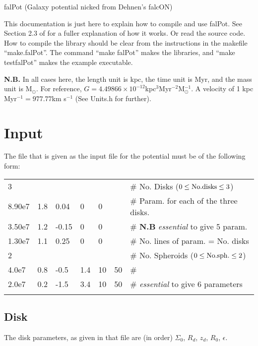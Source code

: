 \documentclass{article}
\begin{document}
\begin{center}
{\huge falPot (Galaxy potential nicked from Dehnen's falcON)}
\end{center}


This documentation is just here to explain how to compile and use 
falPot. See Section 2.3 of \citet{DB98} for a fuller explanation of how it works.
Or read the source code. How to compile the library should be clear from the
instructions in the makefile ``make.falPot''. The command ``make falPot'' makes
the libraries, and ``make testfalPot'' makes the example executable. 

 {\bf N.B.} In all cases here, the
length unit is kpc, the time unit is Myr, and the mass unit is
M$_\odot$. For reference, $G=4.49866\times
10^{-12}$kpc$^3$Myr$^{-2}$M$_\odot^{-1}$. A velocity of 1 kpc Myr$^{-1}
  = 977.77$km s$^{-1}$ (See Units.h for further).

\section{Input} 
The file that is given as the input file for the potential must be of
the following form:

\begin{tabular}{lllllll}
3      &     &      &     &    &     &\# No. Disks ($0\leq{\rm No.disks}\leq3$) \\
8.90e7 & 1.8 & 0.04 & 0   & 0  &     &\# Param. for each of the three disks.\\
3.50e7 & 1.2 & -0.15& 0   & 0  &     &\# {\bf N.B} {\it essential} to
give 5 param.\\  
1.30e7 & 1.1 & 0.25 & 0   & 0  &     &\# No. lines of param. = No. disks\\
2      &     &      &     &    &     &\# No. Spheroids ($0\leq{\rm
  No. sph.}\leq2$) \\
4.0e7   & 0.8 & -0.5 & 1.4 & 10 & 50 &\# \\
2.0e7   & 0.2 & -1.5 & 3.4 & 10 & 50 &\# {\it essential} to give 6 parameters\\
\vspace{5mm}
\end{tabular}

\subsection{Disk}

The disk parameters, as given in that file are (in order) $\Sigma_0$,
$R_d$, $z_d$, $R_0$, $\epsilon$. 
\end{document}
